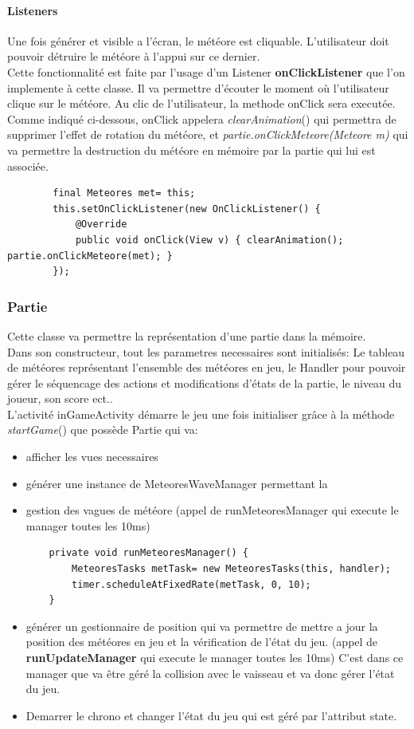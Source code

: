 \documentclass{article}
\begin{document}
\paragraph{Listeners}
Une fois générer et visible a l'écran, le météore est cliquable. L'utilisateur doit pouvoir détruire le météore à l'appui sur ce dernier. \\
Cette fonctionnalité est faite par l'usage d'un Listener \textbf{onClickListener} que l'on implemente à cette classe. Il va permettre d'écouter le moment où l'utilisateur clique sur le météore. Au clic de l'utilisateur, la methode onClick sera executée. Comme indiqué ci-dessous, onClick appelera \textit{clearAnimation}() qui permettra de supprimer l'effet de rotation du météore, et \textit{partie.onClickMeteore(Meteore m)} qui va permettre la destruction du météore en mémoire par la partie qui lui est associée.
\begin{verbatim}
        final Meteores met= this;
        this.setOnClickListener(new OnClickListener() {
            @Override
            public void onClick(View v) { clearAnimation(); partie.onClickMeteore(met); }
        });
\end{verbatim}

\subsubsection{Partie}
Cette classe va permettre la représentation d'une partie dans la mémoire.\\
Dans son constructeur, tout les parametres necessaires sont initialisés: Le tableau de météores représentant l'ensemble des météores en jeu, le Handler pour pouvoir gérer le séquencage des actions et modifications d'états de la partie, le niveau du joueur, son score ect.. \\
L'activité inGameActivity démarre le jeu une fois initialiser grâce à la méthode \textit{startGame}() que possède Partie qui va:
\begin{itemize}
    \item afficher les vues necessaires
    \item générer une instance de MeteoresWaveManager permettant la \item gestion des vagues de météore (appel de runMeteoresManager qui execute le manager toutes les 10ms)
\begin{verbatim}
    private void runMeteoresManager() {
        MeteoresTasks metTask= new MeteoresTasks(this, handler);
        timer.scheduleAtFixedRate(metTask, 0, 10);
    }
\end{verbatim}
    \item générer un gestionnaire de position qui va permettre de mettre a jour la position des météores en jeu et la vérification de l'état du jeu. (appel de \textbf{runUpdateManager} qui execute le manager toutes les 10ms) C'est dans ce manager que va être géré la collision avec le vaisseau et va donc gérer l'état du jeu.
    \item Demarrer le chrono et changer l'état du jeu qui est géré par l'attribut state.
\end{itemize}
\end{document}
